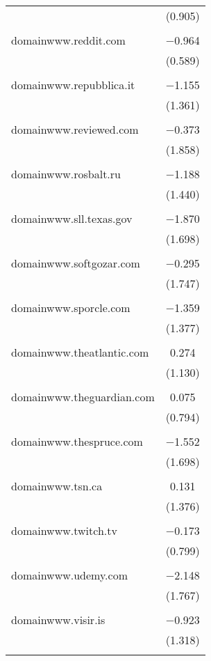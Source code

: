 \begin{table}[!htbp]
\begin{tabular}{@{\extracolsep{5pt}}lc}
  & (0.905) \\ 
  & \\ 
 domainwww.reddit.com & $-$0.964 \\ 
  & (0.589) \\ 
  & \\ 
 domainwww.repubblica.it & $-$1.155 \\ 
  & (1.361) \\ 
  & \\ 
 domainwww.reviewed.com & $-$0.373 \\ 
  & (1.858) \\ 
  & \\ 
 domainwww.rosbalt.ru & $-$1.188 \\ 
  & (1.440) \\ 
  & \\ 
 domainwww.sll.texas.gov & $-$1.870 \\ 
  & (1.698) \\ 
  & \\ 
 domainwww.softgozar.com & $-$0.295 \\ 
  & (1.747) \\ 
  & \\ 
 domainwww.sporcle.com & $-$1.359 \\ 
  & (1.377) \\ 
  & \\ 
 domainwww.theatlantic.com & 0.274 \\ 
  & (1.130) \\ 
  & \\ 
 domainwww.theguardian.com & 0.075 \\ 
  & (0.794) \\ 
  & \\ 
 domainwww.thespruce.com & $-$1.552 \\ 
  & (1.698) \\ 
  & \\ 
 domainwww.tsn.ca & 0.131 \\ 
  & (1.376) \\ 
  & \\ 
 domainwww.twitch.tv & $-$0.173 \\ 
  & (0.799) \\ 
  & \\ 
 domainwww.udemy.com & $-$2.148 \\ 
  & (1.767) \\ 
  & \\ 
 domainwww.visir.is & $-$0.923 \\ 
  & (1.318) \\ 
  & \\ 

\end{tabular}
\end{table}

